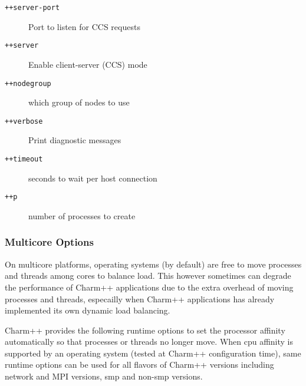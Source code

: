\begin{description}
\item[{\tt ++server-port}]      Port to listen for CCS requests

\item[{\tt ++server}]           Enable client-server (CCS) mode

\item[{\tt ++nodegroup}]        which group of nodes to use

\item[{\tt ++verbose}]          Print diagnostic messages

\item[{\tt ++timeout}]          seconds to wait per host connection

\item[{\tt ++p}]                number of processes to create

\end{description}

\subsubsection{Multicore Options}

On multicore platforms, operating systems (by default) are free to move
processes and threads among cores to balance load. This however sometimes can
degrade the performance of Charm++ applications due to the extra overhead of
moving processes and threads, especailly when Charm++ applications has already
implemented its own dynamic load balancing.

Charm++ provides the following runtime options to set the processor affinity
automatically so that processes or threads no longer move. When cpu affinity
is supported by an operating system (tested at Charm++ configuration time),
same runtime options can be used for all flavors of Charm++ versions including
network and MPI versions, smp and non-smp versions.

